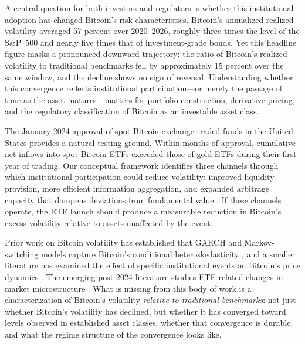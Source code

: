 \documentclass[12pt,a4paper]{article}
\begin{document}
A central question for both investors and regulators is whether this
institutional adoption has changed Bitcoin's risk characteristics. Bitcoin's
annualized realized volatility averaged 57 percent over 2020--2026, roughly
three times the level of the S\&P~500 and nearly five times that of
investment-grade bonds. Yet this headline figure masks a pronounced downward
trajectory: the ratio of Bitcoin's realized volatility to traditional
benchmarks fell by approximately 15 percent over the same window, and the
decline shows no sign of reversal. Understanding whether this convergence
reflects institutional participation---or merely the passage of time as the
asset matures---matters for portfolio construction, derivative pricing, and
the regulatory classification of Bitcoin as an investable asset class.

The January 2024 approval of spot Bitcoin exchange-traded funds in the
United States provides a natural testing ground. Within months of approval,
cumulative net inflows into spot Bitcoin ETFs exceeded those of gold ETFs
during their first year of trading. Our conceptual framework identifies
three channels through which institutional participation could reduce
volatility: improved liquidity provision, more efficient information
aggregation, and expanded arbitrage capacity that dampens deviations from
fundamental value \citep{kyle1985continuous, grossman1980impossibility,
shleifer1997limits}. If these channels operate, the ETF launch should
produce a measurable reduction in Bitcoin's excess volatility relative to
assets unaffected by the event.

Prior work on Bitcoin volatility has established that GARCH and
Markov-switching models capture Bitcoin's conditional heteroskedasticity
\citep{katsiampa2017volatility, dyhrberg2016bitcoin, conrad2018long,
ardia2019regime, caporale2019modelling}, and a smaller literature has
examined the effect of specific institutional events on Bitcoin's price
dynamics \citep{augustin2023causal, kochling2019futures}. The emerging
post-2024 literature studies ETF-related changes in market microstructure
\citep{mazur2025spot, kia2025price, hong2025bitcoin, lee2025shifting}.
What is missing from this body of work is a characterization of Bitcoin's
volatility \emph{relative to traditional benchmarks}: not just whether
Bitcoin's volatility has declined, but whether it has converged toward
levels observed in established asset classes, whether that convergence is
durable, and what the regime structure of the convergence looks like.
\end{document}
